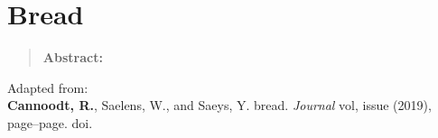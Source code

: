 \newpage{\thispagestyle{empty}\cleardoublepage}
\chapter{Bread} 
\label{chap:brood}

\begin{quote}
	\textbf{Abstract:} \blindtext
\end{quote}

\vfill

Adapted from:\\
\textbf{Cannoodt, R.}, Saelens, W., and Saeys, Y. bread. \textit{Journal} vol, issue (2019), page--page. doi.
\newpage

\blindtext
